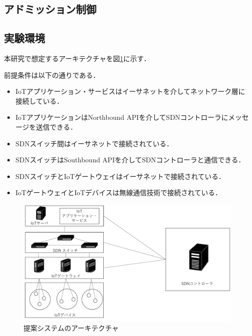\documentclass[a4paper,10pt,twocolumn,uplatex]{jsarticle}
\begin{document}
\subsection{アドミッション制御}


\subsection{実験環境}
本研究で想定するアーキテクチャを図\ref{fig:Architecture}に示す．\par
前提条件は以下の通りである．\par

\begin{itemize}
  \item IoTアプリケーション・サービスはイーサネットを介してネットワーク層に接続している．
  \item IoTアプリケーションはNorthbound APIを介してSDNコントローラにメッセージを送信できる．
  \item SDNスイッチ間はイーサネットで接続されている．
  \item SDNスイッチはSouthbound APIを介してSDNコントローラと通信できる．
  \item SDNスイッチとIoTゲートウェイはイーサネットで接続されている．
  \item IoTゲートウェイとIoTデバイスは無線通信技術で接続されている．
\end{itemize}

\begin{figure}[!tb]
  \centering
  \includegraphics[width=\linewidth]{img/AQRA_Architecture.pdf}
  \caption{提案システムのアーキテクチャ}
  \label{fig:Architecture}
\end{figure}
\end{document}
